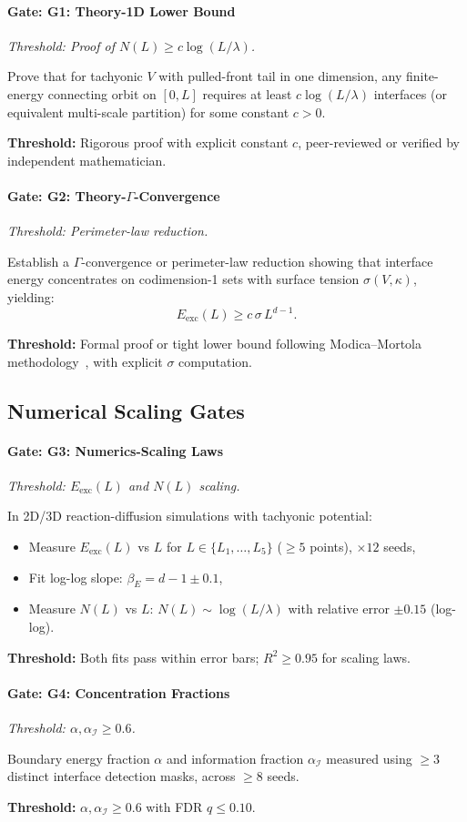 \documentclass{article}
\newenvironment{vdmgate}[2]{%
  \paragraph{Gate: #1} \emph{Threshold: #2.}%
  \par\noindent}{\medskip}
\begin{document}
\begin{vdmgate}{G1: Theory-1D Lower Bound}{Proof of $N(L) \geq c \log(L/\lambda)$}
Prove that for tachyonic $V$ with pulled-front tail in one dimension, any finite-energy connecting orbit on $[0,L]$ requires at least $c \log(L/\lambda)$ interfaces (or equivalent multi-scale partition) for some constant $c > 0$.

\textbf{Threshold:} Rigorous proof with explicit constant $c$, peer-reviewed or verified by independent mathematician.
\end{vdmgate}

\begin{vdmgate}{G2: Theory-$\Gamma$-Convergence}{Perimeter-law reduction}
Establish a $\Gamma$-convergence or perimeter-law reduction showing that interface energy concentrates on codimension-1 sets with surface tension $\sigma(V, \kappa)$, yielding:
\begin{equation}
E_{\text{exc}}(L) \geq c\,\sigma\,L^{d-1}.
\end{equation}

\textbf{Threshold:} Formal proof or tight lower bound following Modica--Mortola methodology~\cite{modica1977gradient}, with explicit $\sigma$ computation.
\end{vdmgate}

\subsection*{Numerical Scaling Gates}

\begin{vdmgate}{G3: Numerics-Scaling Laws}{$E_{\text{exc}}(L)$ and $N(L)$ scaling}
In 2D/3D reaction-diffusion simulations with tachyonic potential:
\begin{itemize}[noitemsep]
\item Measure $E_{\text{exc}}(L)$ vs $L$ for $L \in \{L_1, \ldots, L_5\}$ ($\geq 5$ points), $\times 12$ seeds,
\item Fit log-log slope: $\beta_E = d-1 \pm 0.1$,
\item Measure $N(L)$ vs $L$: $N(L) \sim \log(L/\lambda)$ with relative error $\pm 0.15$ (log-log).
\end{itemize}

\textbf{Threshold:} Both fits pass within error bars; $R^2 \geq 0.95$ for scaling laws.
\end{vdmgate}

\begin{vdmgate}{G4: Concentration Fractions}{$\alpha, \alpha_{\mathcal{I}} \geq 0.6$}
Boundary energy fraction $\alpha$ and information fraction $\alpha_{\mathcal{I}}$ measured using $\geq 3$ distinct interface detection masks, across $\geq 8$ seeds.

\textbf{Threshold:} $\alpha, \alpha_{\mathcal{I}} \geq 0.6$ with FDR $q \leq 0.10$.
\end{vdmgate}
\end{document}
